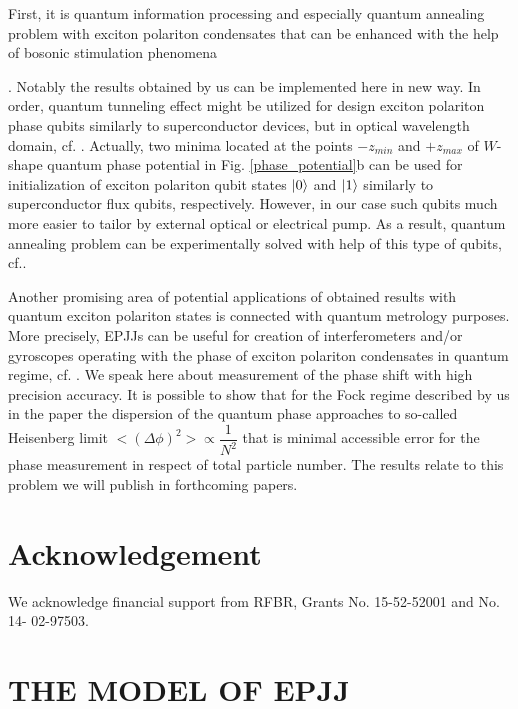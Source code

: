 \documentclass[aps, pre, preprint, groupedaddress, superscriptaddress, showkeys, showpacs] {revtex4-1}
\DeclarePairedDelimiter\ket{\lvert}{\rangle}
\begin{document}
First, it is quantum information processing and especially quantum annealing problem  with exciton polariton condensates that can be enhanced with the help of bosonic stimulation phenomena {\cite{Yan}. Notably the results obtained by us can be implemented  here in new way.  In order, quantum tunneling effect might be utilized  for design exciton polariton phase qubits similarly to superconductor devices, but in optical wavelength domain, cf. \cite{Makhlin}. Actually,  two minima located at the points $-z_{min}$ and $+z_{max}$ of $W$-shape quantum phase potential in Fig. \ref{phase_potential}b can be used for initialization of exciton polariton qubit states $\ket{0}$ and $\ket{1}$ similarly to superconductor flux qubits, respectively. However, in our case such qubits much more easier to tailor by external optical or electrical pump. As a result, quantum annealing problem can be experimentally solved   
with help of this type of qubits, cf.\cite{Johnson}.  
 
Another promising area of potential applications of obtained results with quantum exciton polariton states is connected with quantum metrology purposes. More precisely, EPJJs can be useful for creation of interferometers and/or gyroscopes operating with the phase of  exciton polariton condensates in quantum regime, cf. \cite{Pezze, Gulevich}. We speak here about measurement of the phase shift with high precision accuracy. It is possible to show that for the Fock regime described by us in the paper the dispersion of the quantum phase approaches to so-called Heisenberg limit ${<(\Delta\phi)^2> \propto \dfrac{1}{N^2}}$ that is minimal accessible error for the phase measurement in respect of total particle number. The results relate to this problem we will publish in forthcoming papers. 

\section{Acknowledgement
\label{sec:acknowledgement}}
We  acknowledge financial support from RFBR, Grants No. 15-52-52001 and No. 14-
02-97503.

\appendix
\section{THE MODEL OF EPJJ \label{sec:model}}

}
\end{document}
